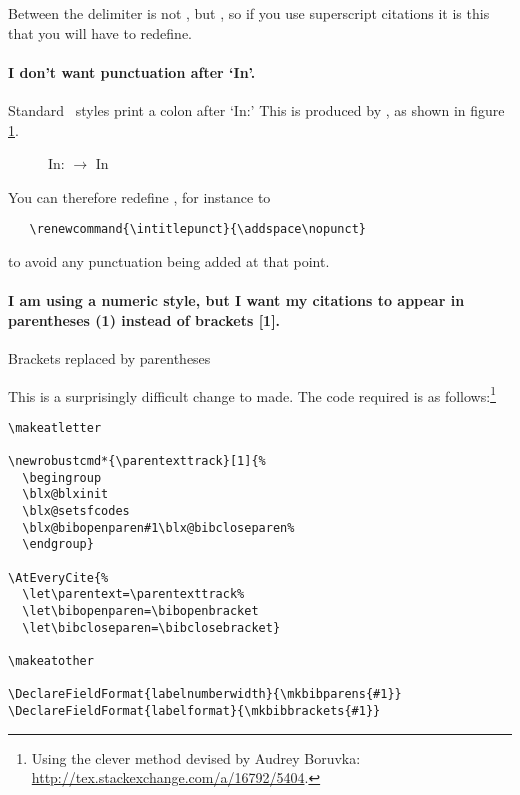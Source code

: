 Between  the delimiter is not
, but , so if you use
superscript citations it is this that you will have to redefine.

\paragraph{I don't want punctuation after `In'.} Standard \biblatex\
styles print a colon after `In:' This is produced by
, as shown in figure \ref{punctcite7}.
\begin{figure}
\caption{In: $\rightarrow$ In}\label{punctcite7}
\end{figure}

You can therefore redefine , for instance to
\begin{Verbatim}
   \renewcommand{\intitlepunct}{\addspace\nopunct}
\end{Verbatim}
to avoid any punctuation being added at that point.

\paragraph{I am using a numeric style, but I want my citations to
  appear in parentheses (1) instead of brackets
  [1].}\label{recipe:brackets}
\begin{marginfigure}[8ex]
\vspace{3pt}%
\caption{Brackets replaced by parentheses}\label{punctcite7}
\end{marginfigure}
This is a surprisingly difficult change to made. The code required is
as follows:\footnote{Using the clever method devised by Audrey
  Boruvka: \url{http://tex.stackexchange.com/a/16792/5404}.}

\begin{Verbatim}
\makeatletter

\newrobustcmd*{\parentexttrack}[1]{%
  \begingroup
  \blx@blxinit
  \blx@setsfcodes
  \blx@bibopenparen#1\blx@bibcloseparen%
  \endgroup}

\AtEveryCite{%
  \let\parentext=\parentexttrack%
  \let\bibopenparen=\bibopenbracket
  \let\bibcloseparen=\bibclosebracket}

\makeatother

\DeclareFieldFormat{labelnumberwidth}{\mkbibparens{#1}}
\DeclareFieldFormat{labelformat}{\mkbibbrackets{#1}}
\end{Verbatim}


